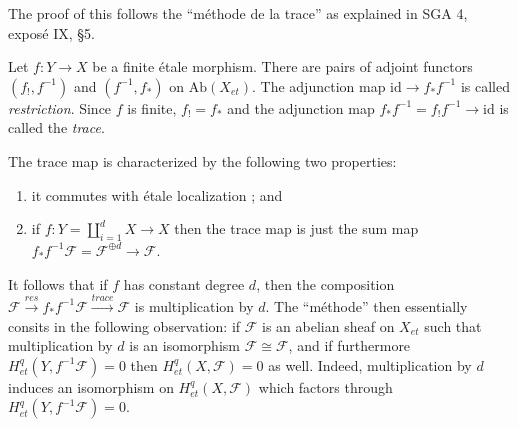 
The proof of this follows the ``m\'ethode de la trace'' as explained in SGA 4, 
expos\'e IX, \S5. 
\begin{definition}
Let $f : Y \to X$ be a finite \'etale morphism. There are pairs of adjoint 
functors $(f_!,f^{-1})$ and $(f^{-1},f_*)$ on $\text{Ab}(X_{et})$. The 
adjunction map $\text{id} \to f_* f^{-1}$ is called \emph{restriction}. Since 
$f$ is finite, $f_! = f_*$ and the adjunction map $f_* f^{-1} = f_! f^{-1} \to 
\text{id}$ is called the \emph{trace}.  
\end{definition}

The trace map is characterized by the following two properties:
\begin{enumerate}
\item
it commutes with \'etale localization ; and
\item
if $f: Y = \coprod_{i=1}^d X \to X$ then the trace map is just the sum map $f_* 
f^{-1} \mathcal{F} = \mathcal{F}^{\oplus d} \to \mathcal{F}$.
\end{enumerate}

It follows that if $f$ has constant degree $d$, then the composition 
$\mathcal{F} \xrightarrow{res} f_* f^{-1} \mathcal{F} \xrightarrow{trace} 
\mathcal{F}$ is multiplication by $d$. The ``m\'ethode'' then essentially 
consits in the following observation: if $\mathcal{F}$ is an abelian sheaf on 
$X_{et}$ such that multiplication by $d$ is an isomorphism $\mathcal{F} \cong 
\mathcal{F}$, and if furthermore $H_{et}^q(Y,f^{-1}\mathcal{F}) = 0$ then 
$H_{et}^q(X,\mathcal{F}) = 0$ as well. Indeed, multiplication by $d$ induces an 
isomorphism on $H_{et}^q(X, \mathcal{F})$ which factors through 
$H_{et}^q(Y,f^{-1}\mathcal{F})= 0$.

